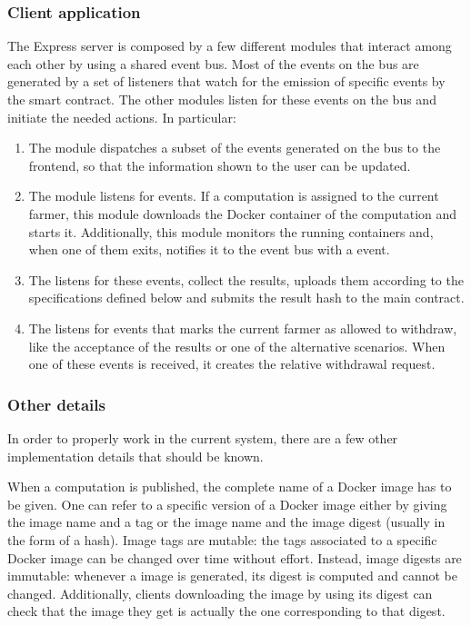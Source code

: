 \subsubsection{Client application}
The Express server is composed by a few different modules that interact among each other by using a shared event bus. Most of the events on the bus are generated by a set of listeners that watch for the emission of specific events by the smart contract. The other modules listen for these events on the bus and initiate the needed actions. In particular:
\begin{enumerate}
    \item The  module dispatches a subset of the events generated on the bus to the frontend, so that the information shown to the user can be updated.
    \item The  module listens for  events. If a computation is assigned to the current farmer, this module downloads the Docker container of the computation and starts it. Additionally, this module monitors the running containers and, when one of them exits, notifies it to the event bus with a  event.
    \item The  listens for these  events, collect the results, uploads them according to the specifications defined below and submits the result hash to the main contract.
    \item The  listens for events that marks the current farmer as allowed to withdraw, like the acceptance of the results or one of the alternative scenarios. When one of these events is received, it creates the relative withdrawal request.
\end{enumerate}

\subsubsection{Other details}
In order to properly work in the current system, there are a few other implementation details that should be known.

When a computation is published, the complete name of a Docker image has to be given. One can refer to a specific version of a Docker image either by giving the image name and a tag or the image name and the image digest (usually in the form of a  hash). Image tags are mutable: the tags associated to a specific Docker image can be changed over time without effort. Instead, image digests are immutable: whenever a image is generated, its digest is computed and cannot be changed. Additionally, clients downloading the image by using its digest can check that the image they get is actually the one corresponding to that digest. 

